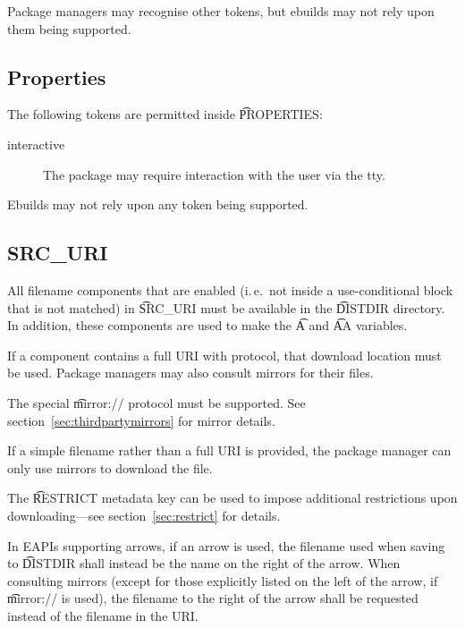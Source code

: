 Package managers may recognise other tokens, but ebuilds may not rely upon them being supported.

\subsection{Properties}
\label{sec:properties}

The following tokens are permitted inside \t{PROPERTIES}:

\begin{description}
\item[interactive] The package may require interaction with the user via the tty.
\end{description}

Ebuilds may not rely upon any token being supported.

\subsection{SRC\_URI}
\label{sec:src-uri-behaviour}

All filename components that are enabled (i.\,e.\ not inside a use-conditional block that is not
matched) in \t{SRC\_URI} must be available in the \t{DISTDIR} directory. In addition, these
components are used to make the \t{A} and \t{AA} variables.

If a component contains a full URI with protocol, that download location must be used. Package
managers may also consult mirrors for their files.

The special \t{mirror://} protocol must be supported. See section~\ref{sec:thirdpartymirrors} for mirror
details.

If a simple filename rather than a full URI is provided, the package manager can only use mirrors to
download the file.

The \t{RESTRICT} metadata key can be used to impose additional restrictions upon downloading---see
section~\ref{sec:restrict} for details.

 In EAPIs supporting arrows, if an arrow is used, the filename used
when saving to \t{DISTDIR} shall instead be the name on the right of the arrow. When consulting
mirrors (except for those explicitly listed on the left of the arrow, if \t{mirror://} is used), the
filename to the right of the arrow shall be requested instead of the filename in the URI.


